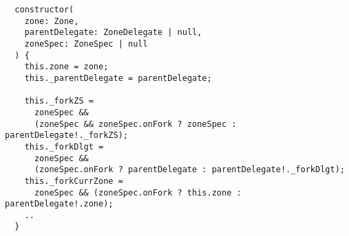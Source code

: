 \begin{verbatim}
  constructor(
    zone: Zone,
    parentDelegate: ZoneDelegate | null,
    zoneSpec: ZoneSpec | null
  ) {
    this.zone = zone;
    this._parentDelegate = parentDelegate;

    this._forkZS =
      zoneSpec &&
      (zoneSpec && zoneSpec.onFork ? zoneSpec : parentDelegate!._forkZS);
    this._forkDlgt =
      zoneSpec &&
      (zoneSpec.onFork ? parentDelegate : parentDelegate!._forkDlgt);
    this._forkCurrZone =
      zoneSpec && (zoneSpec.onFork ? this.zone : parentDelegate!.zone);
    ..
  }
\end{verbatim}
